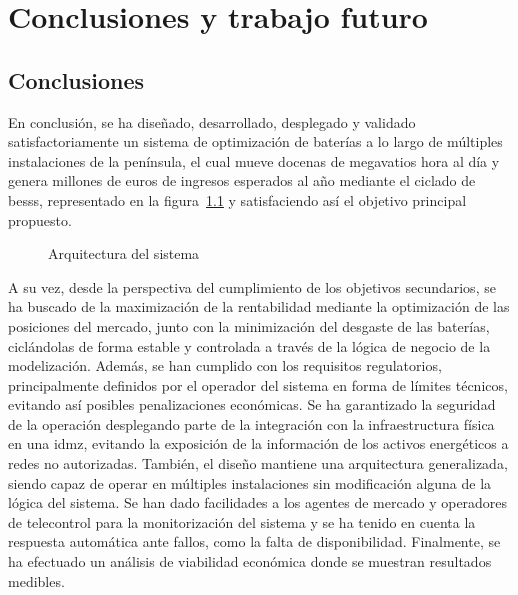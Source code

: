 \cleardoublepage

\chapter{Conclusiones y trabajo futuro}
\label{makereference8}

\section{Conclusiones}
\label{makereference8.1}

En conclusión, se ha diseñado, desarrollado, desplegado y validado satisfactoriamente un sistema de optimización de baterías a lo largo de múltiples instalaciones de la península, el cual mueve docenas de megavatios hora al día y genera millones de euros de ingresos esperados al año mediante el ciclado de \glspl{bess}, representado en la figura~\ref{fig:arquitectura-sistema} y satisfaciendo así el objetivo principal propuesto.

\begin{figure}
  \centering
  \caption{Arquitectura del sistema}
  \label{fig:arquitectura-sistema}
\end{figure}

A su vez, desde la perspectiva del cumplimiento de los objetivos secundarios, se ha buscado de la maximización de la rentabilidad mediante la optimización de las posiciones del mercado, junto con la minimización del desgaste de las baterías, ciclándolas de forma estable y controlada a través de la lógica de negocio de la modelización. Además, se han cumplido con los requisitos regulatorios, principalmente definidos por el operador del sistema en forma de límites técnicos, evitando así posibles penalizaciones económicas. Se ha garantizado la seguridad de la operación desplegando parte de la integración con la infraestructura física en una \gls{idmz}, evitando la exposición de la información de los activos energéticos a redes no autorizadas. También, el diseño mantiene una arquitectura generalizada, siendo capaz de operar en múltiples instalaciones sin modificación alguna de la lógica del sistema. Se han dado facilidades a los agentes de mercado y operadores de telecontrol para la monitorización del sistema y se ha tenido en cuenta la respuesta automática ante fallos, como la falta de disponibilidad. Finalmente, se ha efectuado un análisis de viabilidad económica donde se muestran resultados medibles.

